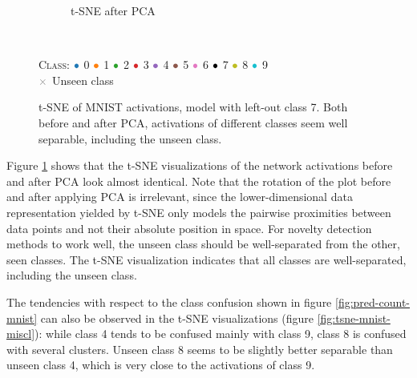 \documentclass[10pt]{article}
\newcommand{\legendBulletMNIST}{
    \begin{minipage}[t]{0.5\textwidth}
    \centering
    \textsc{Class}:
    ${\color[rgb]{0.12, 0.47, 0.71}\bullet}$ 0
    ${\color[rgb]{1.0, 0.5, 0.05}\bullet}$ 1
    ${\color[rgb]{0.17, 0.63, 0.17}\bullet}$ 2
    ${\color[rgb]{0.84, 0.15, 0.16}\bullet}$ 3
    ${\color[rgb]{0.58, 0.4, 0.74}\bullet}$ 4
    ${\color[rgb]{0.55, 0.34, 0.29}\bullet}$ 5
    ${\color[rgb]{0.89, 0.47, 0.76}\bullet}$ 6
    ${\color[rgb]{0, 0, 0}\bullet}$ 7
    ${\color[rgb]{0.74, 0.74, 0.13}\bullet}$ 8
    ${\color[rgb]{0.09, 0.75, 0.81}\bullet}$ 9\\
    ${\color[rgb]{0.5, 0.5, 0.5}\times}$ Unseen class
    \end{minipage}
    }
\begin{document}
\begin{figure}[H]
\begin{subfigure}{.5\textwidth}
        \caption{\gls{t-SNE} after \gls{PCA}}
    \end{subfigure}
    \\[.2cm]
    \legendBulletMNIST
    \caption{\gls{t-SNE} of \gls{MNIST} activations, model with left-out class 7. Both before and after \gls{PCA}, activations of different classes seem well separable, including the unseen class. }
    \label{fig:tsne-mnist}
\end{figure}

Figure \ref{fig:tsne-mnist} shows that the \gls{t-SNE} visualizations of the network activations before and after \gls{PCA} look almost identical. Note that the rotation of the plot before and after applying \gls{PCA} is irrelevant, since the lower-dimensional data representation yielded by \gls{t-SNE} only models the pairwise proximities between data points and not their absolute position in space. For novelty detection methods to work well, the unseen class should be well-separated from the other, seen classes. The t-SNE visualization indicates that all classes are well-separated, including the unseen class.

The tendencies with respect to the class confusion shown in figure \ref{fig:pred-count-mnist} can also be observed in the \gls{t-SNE} visualizations (figure \ref{fig:tsne-mnist-miscl}): while class 4 tends to be confused mainly with class 9, class 8 is confused with several clusters.  Unseen class 8 seems to be slightly better separable than unseen class 4, which is very close to the activations of class 9.
\end{document}
